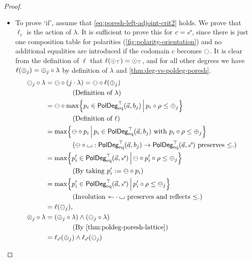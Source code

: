 \documentclass[a4paper]{memoir}
\begin{document}
\begin{proof}
\begin{enumerate}
\begin{itemize}
			\item To prove `if', assume that \cref{eq:poresh-left-adjoint-crit2} holds. We prove that $\ell_c$ is the action of $\lambda$.
			It is sufficient to prove this for $c = \ypolar$, since there is just one composition table for polarities (\cref{fig:polarity-orientation}) and no additional equalities are introduced if the codomain $c$ becomes $\npolar$.
			It is clear from the definition of $\ell$ that $\ell({\odot}_\top) = {\odot}_\top$, and for all other degrees we have $\ell({\oplus}_j) = {\oplus}_j \circ \lambda$ by definition of $\lambda$ and \cref{thm:deg-vs-poldeg-poresh}.
			\begin{align*}
				\negpol_j \circ \lambda
				&= \negpol \circ (j \cdot \lambda)
				= \negpol \circ \ell(\pospol_j) \\
				& \qquad \qquad \text{(Definition of $\lambda$)} \\
				&= \negpol \circ \max \set{p_i \in \poldegeqtop(\vec a, b_j)}{p_i \circ \rho \leq \pospol_j} \\
				& \qquad \qquad \text{(Definition of $\ell$)} \\
				&= \max \set{\negpol \circ p_i}{p_i \in \poldegeqtop(\vec a, b_j) \text{ with } p_i \circ \rho \leq \pospol_j} \\
				& \qquad \qquad \text{($\negpol \circ \loch : \poldegeqtop(\vec a, b_j) \to \poldegeqtop(\vec a, \ypolar)$ preserves $\leq$.)} \\
				&= \max \set{p'_i \in \poldegeqtop(\vec a, \ypolar)}{\negpol \circ p'_i \circ \rho \leq \pospol_j} \\
				& \qquad \qquad \text{(By taking $p'_i := \negpol \circ p_i$)} \\
				&= \max \set{p'_i \in \poldegeqtop(\vec a, \ypolar)}{p'_i \circ \rho \leq \negpol_j} \\
				& \qquad \qquad \text{(Involution $\tejsym \cdot \loch$ preserves and reflects $\leq$.)} \\
				&= \ell(\negpol_j), \\
				\mixpol_j \circ \lambda
				&= (\pospol_j \circ \lambda) \wedge (\negpol_j \circ \lambda) \\
				& \qquad \qquad \text{(By \cref{thm:poldeg-poresh-lattice})} \\
				&= \ell_\ypolar(\pospol_j) \wedge \ell_\ypolar(\negpol_j) \\

\end{align*}
\end{itemize}
\end{enumerate}
\end{proof}
\end{document}
